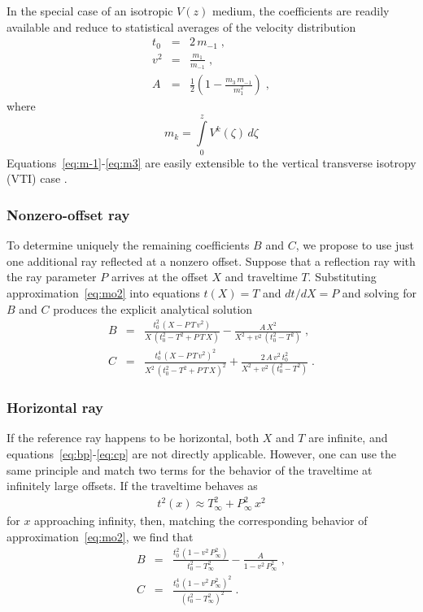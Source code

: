 In the special case of an isotropic $V(z)$ medium,
the coefficients are readily available and reduce to statistical
averages of the velocity distribution \cite[]{bolshykh}
\begin{eqnarray}
  \label{eq:m-1}
  t_0 & = & 2\,m_{-1}\;, \\
  \label{eq:m1}
  v^2 & = & \frac{m_1}{m_{-1}}\;, \\
  \label{eq:m3}
  A & = & \frac{1}{2}\left(1-\frac{m_3\,m_{-1}}{m_1^2}\right)\;,
\end{eqnarray}
where
\[
m_k = \int\limits_{0}^{z} V^k(\zeta)\,d \zeta
\]
Equations~\ref{eq:m-1}-\ref{eq:m3} are easily extensible to the
vertical transverse isotropy (VTI) case
\cite[]{lyakh,blias0,GEO62-02-06620675,ursin}.

\subsubsection{Nonzero-offset ray}

To determine uniquely the remaining coefficients $B$ and $C$, we
propose to use just one additional ray reflected at a nonzero offset.
Suppose that a reflection ray with the ray parameter $P$ arrives at
the offset $X$ and traveltime $T$. Substituting
approximation~\ref{eq:mo2} into equations $t(X)=T$ and $dt/dX=P$ and
solving for $B$ and $C$ produces the explicit analytical solution
\begin{eqnarray}
  \label{eq:bp}
  B & = & \frac{t_0^2\,(X - P\,T\,v^2)}{X\,(t_0^2-T^2+P\,T\,X)} -
  \frac{A\,X^2}{X^2 + v^2\,(t_0^2-T^2)}\;, \\
  \label{eq:cp}
  C & = & \frac{t_0^4\,(X - P\,T\,v^2)^2}{X^2\,(t_0^2-T^2+P\,T\,X)^2} +
  \frac{2\,A\,v^2\,t_0^2}{X^2 + v^2\,(t_0^2-T^2)}\;.
\end{eqnarray}

\subsubsection{Horizontal ray}

If the reference ray happens to be horizontal, both $X$ and $T$ are
infinite, and equations~\ref{eq:bp}-\ref{eq:cp} are not directly
applicable. However, one can use the same principle and match two
terms for the behavior of the traveltime at infinitely large
offsets. If the traveltime behaves as
\begin{eqnarray}
  \label{eq:infty}
  t^2(x) \approx T_{\infty}^2 + P_{\infty}^2\,x^2
\end{eqnarray}
for $x$ approaching infinity, then, matching the corresponding
behavior of approximation~\ref{eq:mo2}, we find that
\begin{eqnarray}
  \label{eq:bi}
  B & = & \frac{t_0^2\,(1 - v^2\,P_{\infty}^2)}{t_0^2-T_{\infty}^2} -
  \frac{A}{1 - v^2\,P_{\infty}^2}\;, \\
  \label{eq:ci}
  C & = & \frac{t_0^4\,(1 - v^2\,P_{\infty}^2)^2}{(t_0^2-T_{\infty}^2)^2}\;.
\end{eqnarray}

